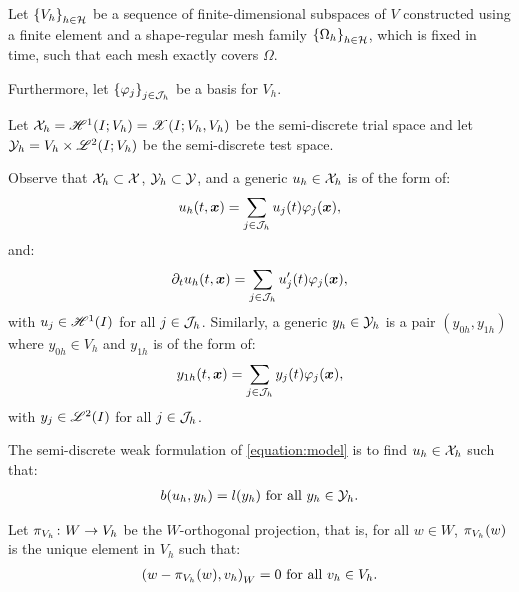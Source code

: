 Let $\left\{ V_h \right\}_{h \in \mathcal{H}}$ be a sequence of finite-dimensional subspaces of $V$ constructed using a finite element and a shape-regular mesh family $\left\{ \Omega_{h} \right\}_{h \in \mathcal{H}}$, which is fixed in time, such that each mesh exactly covers $\Omega$.

Furthermore, let $\left\{ \varphi_j \right\}_{j \in \mathcal{J}_h}$ be a basis for $V_h$.

\begin{definition}
    Let $\mathcal{X}_h = \mathscr{H}^{1}(I; V_h) = \mathscr{X}(I; V_h, V_h)$ be the semi-discrete trial space and let $\mathcal{Y}_h = V_h \times \mathscr{L}^{2}(I; V_h)$ be the semi-discrete test space.
\end{definition}

Observe that $\mathcal{X}_h \subset \mathcal{X}$, $\mathcal{Y}_h \subset \mathcal{Y}$, and a generic $u_h \in \mathcal{X}_h$ is of the form of:
\begin{gather}
    u_h(t, \bm{x}) = \sum_{j \in \mathcal{J}_h} u_j(t) \varphi_j(\bm{x}),
\end{gather}
and:
\begin{gather}
    \partial_t u_h(t, \bm{x}) = \sum_{j \in \mathcal{J}_h} u_j^{\prime}(t) \varphi_j(\bm{x}),
\end{gather}
with $u_j \in \mathscr{H}^{1}(I)$ for all $j \in \mathcal{J}_h$. Similarly, a generic $y_h \in \mathcal{Y}_h$ is a pair $(y_{0h}, y_{1h})$ where $y_{0h} \in V_h$ and $y_{1h}$ is of the form of:
\begin{gather}
    y_{1h}(t, \bm{x}) = \sum_{j \in \mathcal{J}_h} y_j(t) \varphi_j(\bm{x}),
\end{gather}
with $y_j \in \mathscr{L}^{2}(I)$ for all $j \in \mathcal{J}_h$.

\begin{definition}
    The semi-discrete weak formulation of \cref{equation:model} is to find $u_h \in \mathcal{X}_h$ such that:
    \begin{gather} \label{equation:weak_h1}
        b(u_h, y_h) = l(y_h) \text{ for all } y_h \in \mathcal{Y}_h.
    \end{gather}
\end{definition}

\begin{definition}[$\ProjectionOnto{V_h}$]
    Let $\pi_{V_h} \colon W \rightarrow V_h$ be the $W$-orthogonal projection, that is, for all $w \in W$, $\pi_{V_h}(w)$ is the unique element in $V_h$ such that:
    \begin{gather}
        \left( w - \pi_{V_h}(w), v_h \right)_W = 0 \text{ for all } v_h \in V_h.
    \end{gather}
\end{definition}

